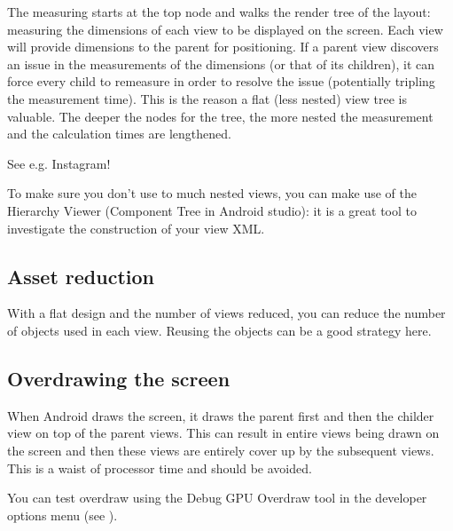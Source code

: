 The measuring starts at the top node and walks the render tree of the layout: measuring the dimensions of each view to be displayed on the screen. Each view will provide dimensions to the parent for positioning. If a parent view discovers an issue in the measurements of the dimensions (or that of its children), it can force every child to remeasure in order to resolve the issue (potentially tripling the measurement time). This is the reason a flat (less nested) view tree is valuable. The deeper the nodes for the tree, the more nested the measurement and the calculation times are lengthened.

See e.g. Instagram! \cite{Kieft2014}


To make sure you don't use to much nested views, you can make use of the Hierarchy Viewer (Component Tree in Android studio): it is a great tool to investigate the construction of your view XML. 

\subsection{Asset reduction}
With a flat design and the number of views reduced, you can reduce the number of objects used in each view. Reusing the objects can be a good strategy here.

\subsection{Overdrawing the screen}
When Android draws the screen, it draws the parent first and then the childer view on top of the parent views. This can result in entire views being drawn on the screen and then these views are entirely cover up by the subsequent views. This is a waist of processor time and should be avoided. 

You can test overdraw using the Debug GPU Overdraw tool in the developer options menu (see \cite{Google2017b}).

 



